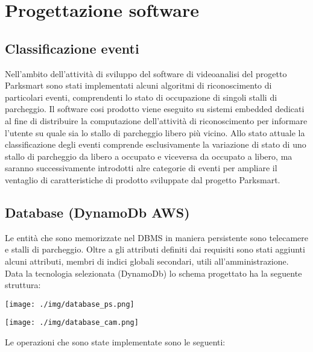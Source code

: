 \chapter{Progettazione software}


\section{Classificazione eventi}
Nell'ambito dell'attività di sviluppo del software di videoanalisi del progetto Parksmart sono stati implementati alcuni algoritmi di riconoscimento di particolari eventi, comprendenti lo stato di occupazione di singoli stalli di parcheggio. Il software cosi prodotto viene eseguito su sistemi embedded dedicati al fine di distribuire la computazione dell'attività di riconoscimento per informare l'utente su quale sia lo stallo di parcheggio libero più vicino. Allo stato attuale la classificazione degli eventi comprende esclusivamente la variazione di stato di uno stallo di parcheggio da libero a occupato e viceversa da occupato a libero, ma saranno successivamente introdotti alre categorie di eventi per ampliare il ventaglio di caratteristiche di prodotto sviluppate dal progetto Parksmart.
\vspace{5.7truecm}

\section{Database (DynamoDb AWS)}
Le entità che sono memorizzate nel DBMS in maniera persistente sono telecamere e stalli di parcheggio. Oltre a gli attributi definiti dai requisiti sono stati aggiunti alcuni attributi, membri di indici globali secondari, utili all'amministrazione. Data la tecnologia selezionata (DynamoDb) lo schema progettato ha la seguente struttura:

\vspace{0.5truecm}

\centerline{\texttt{[image: ./img/database\_ps.png]}}

\vspace{0.5truecm}

\centerline{\texttt{[image: ./img/database\_cam.png]}}

\vspace{0.5truecm}

Le operazioni che sono state implementate sono le seguenti:



